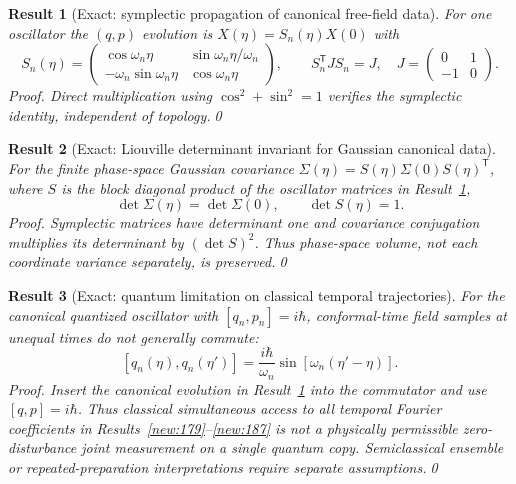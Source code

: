 \documentclass[aps,prd,onecolumn,notitlepage,groupedaddress,11pt]{revtex4-2}
\newtheorem{result}{Result}
\begin{document}
\begin{result}[\textsf{Exact}: symplectic propagation of canonical free-field data]\label{new:190}
For one oscillator the $(q,p)$ evolution is $X(\eta)=S_n(\eta)X(0)$ with
\begin{equation}\label{new:eq190}
 S_n(\eta)=\begin{pmatrix}\cos\omega_n\eta&\sin\omega_n\eta/\omega_n\\-\omega_n\sin\omega_n\eta&\cos\omega_n\eta\end{pmatrix},\qquad S_n^{\mathsf T}JS_n=J,\quad J=\begin{pmatrix}0&1\\-1&0\end{pmatrix}.
\end{equation}
\textit{Proof.} Direct multiplication using $\cos^2+\sin^2=1$ verifies the symplectic identity, independent of topology.\qed
\end{result}

\begin{result}[\textsf{Exact}: Liouville determinant invariant for Gaussian canonical data]\label{new:191}
For the finite phase-space Gaussian covariance $\Sigma(\eta)=S(\eta)\Sigma(0)S(\eta)^{\mathsf T}$, where $S$ is the block diagonal product of the oscillator matrices in Result~\ref{new:190},
\begin{equation}\label{new:eq191}
 \det\Sigma(\eta)=\det\Sigma(0),\qquad \det S(\eta)=1.
\end{equation}
\textit{Proof.} Symplectic matrices have determinant one and covariance conjugation multiplies its determinant by $(\det S)^2$. Thus phase-space volume, not each coordinate variance separately, is preserved.\qed
\end{result}

\begin{result}[\textsf{Exact}: quantum limitation on classical temporal trajectories]\label{new:192}
For the canonical quantized oscillator with $[q_n,p_n]=i\hbar$, conformal-time field samples at unequal times do \emph{not} generally commute:
\begin{equation}\label{new:eq192}
 [q_n(\eta),q_n(\eta')]=\frac{i\hbar}{\omega_n}\sin[\omega_n(\eta'-\eta)].
\end{equation}
\textit{Proof.} Insert the canonical evolution in Result~\ref{new:190} into the commutator and use $[q,p]=i\hbar$. Thus classical simultaneous access to all temporal Fourier coefficients in Results~\ref{new:179}--\ref{new:187} is not a physically permissible zero-disturbance joint measurement on a single quantum copy. Semiclassical ensemble or repeated-preparation interpretations require separate assumptions.\qed
\end{result}
\end{document}
